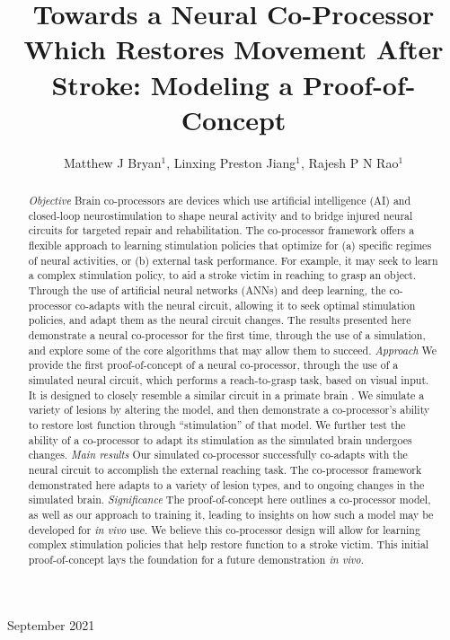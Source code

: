 \documentclass[12pt]{iopart}
\begin{document}
\title[Modeling a Neural Co-Processor]
{Towards a Neural Co-Processor Which Restores Movement After Stroke: Modeling a Proof-of-Concept}

\author{Matthew J Bryan$^{1}$, Linxing Preston Jiang$^{1}$, Rajesh P N Rao$^{1}$}

\address{$^{1}$ Neural Systems Laboratory, Department of Computer
Science and Engineering, University of Washington, Box 352350,
Seattle, WA 98105, USA}

\vspace{10pt}
\begin{indented}
\item[]September 2021
\end{indented}

\begin{abstract}
\textit{Objective} Brain co-processors\cite{rao.coproc} are devices which use artificial
intelligence (AI) and closed-loop neurostimulation to shape neural activity and to bridge
injured neural circuits for targeted repair and rehabilitation. The co-processor framework
offers a flexible approach to learning stimulation policies that optimize for
(a) specific regimes of neural activities, or (b) external task performance.
For example, it may seek to learn a complex stimulation policy, to aid a
stroke victim in reaching to grasp an object.
Through the use of artificial neural networks (ANNs) and deep learning, the
co-processor co-adapts with the neural circuit, allowing it to seek optimal
stimulation policies, and adapt them as the neural circuit changes. The results
presented here demonstrate a neural co-processor for the first time, through
the use of a simulation, and explore some of the core algorithms that may allow them
to succeed. \textit{Approach} We provide the first proof-of-concept of a neural
co-processor, through the use of a simulated neural circuit, which  performs a
reach-to-grasp task, based on visual input. It is designed to closely resemble
a similar circuit in a primate brain \cite{michaels.mrnn}. We simulate a
variety of lesions by altering the model, and
then demonstrate a co-processor's ability to restore lost function through
``stimulation'' of that model. We further test the ability of a
co-processor to adapt its stimulation as the simulated brain
undergoes changes. \textit{Main results} Our simulated co-processor
successfully co-adapts with the neural circuit to accomplish the external reaching
task. The co-processor framework demonstrated here adapts to a variety of lesion
types, and to ongoing changes in the simulated brain. \textit{Significance} The proof-of-concept here
outlines a co-processor model, as well as our approach to training it, leading to
insights on how such a model may be developed for \textit{in vivo} use. We believe this
co-processor design will allow for learning complex stimulation policies that
help restore function to a stroke victim. This initial proof-of-concept lays
the foundation for a future demonstration \textit{in vivo}.
\end{abstract}
\end{document}
